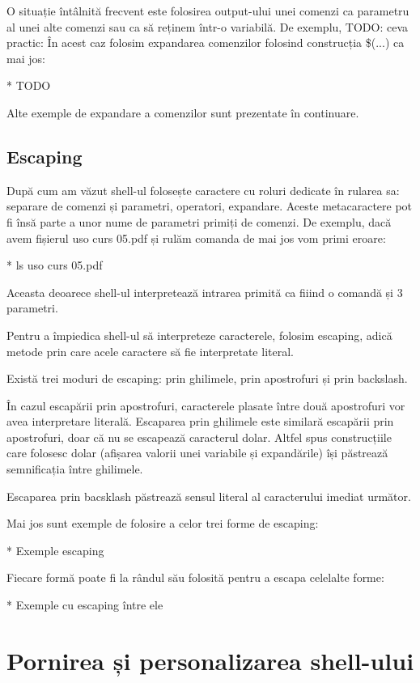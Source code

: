 O situație întâlnită frecvent este folosirea output-ului unei comenzi ca
parametru al unei alte comenzi sau ca să reținem într-o variabilă. De exemplu,
TODO: ceva practic: În acest caz folosim expandarea comenzilor folosind
construcția \$(...) ca mai jos:

* TODO

Alte exemple de expandare a comenzilor sunt prezentate în continuare.

\subsection{Escaping}
\label{sec:cli-escaping}

După cum am văzut shell-ul folosește caractere cu roluri dedicate în rularea sa:
separare de comenzi și parametri, operatori, expandare. Aceste metacaractere pot
fi însă parte a unor nume de parametri primiți de comenzi. De exemplu, dacă avem
fișierul uso curs 05.pdf și rulăm comanda de mai jos vom primi eroare:

* ls uso curs 05.pdf

Aceasta deoarece shell-ul interpretează intrarea primită ca fiiind o comandă și
3 parametri.

Pentru a împiedica shell-ul să interpreteze caracterele, folosim escaping, adică
metode prin care acele caractere să fie interpretate literal.

Există trei moduri de escaping: prin ghilimele, prin apostrofuri și prin
backslash.

În cazul escapării prin apostrofuri, caracterele plasate între două apostrofuri
vor avea interpretare literală. Escaparea prin ghilimele este similară escapării
prin apostrofuri, doar că nu se escapează caracterul dolar. Altfel spus
construcțiile care folosesc dolar (afișarea valorii unei variabile și
expandările) își păstrează semnificația între ghilimele.

Escaparea prin bacsklash păstrează sensul literal al caracterului imediat
următor.

Mai jos sunt exemple de folosire a celor trei forme de escaping:

* Exemple escaping

Fiecare formă poate fi la rândul său folosită pentru a escapa celelalte forme:

* Exemple cu escaping între ele

\section{Pornirea și personalizarea shell-ului}
\label{sec:cli-customize-shell}


